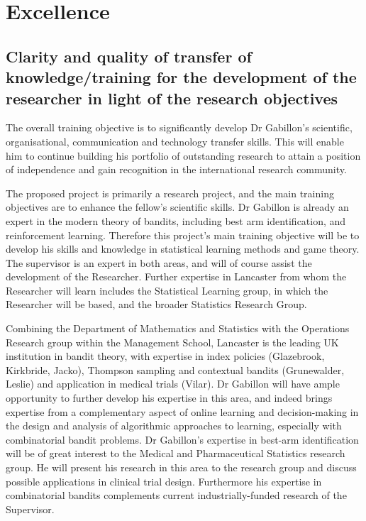 \documentclass[a4paper,11pt]{article}
\renewcommand{\cite}{\autocite} %
\begin{document}
\newpage

\section{Excellence}
\label{sec:excellence}






\subsection{Clarity and quality of transfer of knowledge/training for the development of the researcher in light of the research objectives}
\label{sec:transfer}


The overall training objective is to significantly develop Dr Gabillon's scientific, organisational, communication and technology transfer skills.  This will enable him to continue building his portfolio of outstanding research to attain a position of independence and gain recognition in the international research community.

The proposed project is primarily a research project, and the main training objectives are to enhance the fellow's scientific skills. Dr Gabillon is already an expert in the modern theory of bandits, including best arm identification, and reinforcement learning.  Therefore this project's main training objective will be to develop his skills and knowledge in statistical learning methods and game theory.  The supervisor is an expert in both areas, and will of course assist the development of the Researcher.  Further expertise in Lancaster from whom the Researcher will learn includes the Statistical Learning group, in which the Researcher will be based, and the broader Statistics Research Group.

Combining the Department of Mathematics and Statistics with the Operations Research group within the Management School, Lancaster is the leading UK institution in bandit theory, with expertise in index policies (Glazebrook, Kirkbride, Jacko), Thompson sampling and contextual bandits (Grunewalder, Leslie) and application in medical trials (Vilar). Dr Gabillon will have ample opportunity to further develop his expertise in this area, and indeed brings expertise from a complementary aspect of online learning and decision-making in the design and analysis of algorithmic approaches to learning, especially with combinatorial bandit problems.   Dr Gabillon's expertise in best-arm identification will be of great interest to the Medical and Pharmaceutical Statistics research group.  He will present his research in this area to the research group and discuss possible applications in clinical trial design.  Furthermore his expertise in combinatorial bandits complements current industrially-funded research of the Supervisor.
\end{document}
